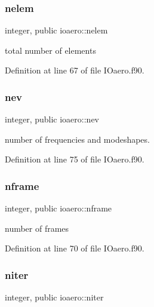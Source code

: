 \mbox{\label{namespaceioaero_a543ebf3623a96606d0956211621ce254}} 
\subsubsection{\texorpdfstring{nelem}{nelem}}
{\footnotesize\ttfamily integer, public ioaero\+::nelem}



total number of elements 



Definition at line 67 of file I\+Oaero.\+f90.

\mbox{\label{namespaceioaero_a1216c8699aea9eb27e3d795cc9d8d271}} 
\subsubsection{\texorpdfstring{nev}{nev}}
{\footnotesize\ttfamily integer, public ioaero\+::nev}



number of frequencies and modeshapes. 



Definition at line 75 of file I\+Oaero.\+f90.

\mbox{\label{namespaceioaero_ac9fe2ddcc0797f81e7bc475a28692978}} 
\subsubsection{\texorpdfstring{nframe}{nframe}}
{\footnotesize\ttfamily integer, public ioaero\+::nframe}



number of frames 



Definition at line 70 of file I\+Oaero.\+f90.

\mbox{\label{namespaceioaero_ac008486fd12e0029a1ef77b3ca5e12c3}} 
\subsubsection{\texorpdfstring{niter}{niter}}
{\footnotesize\ttfamily integer, public ioaero\+::niter}



